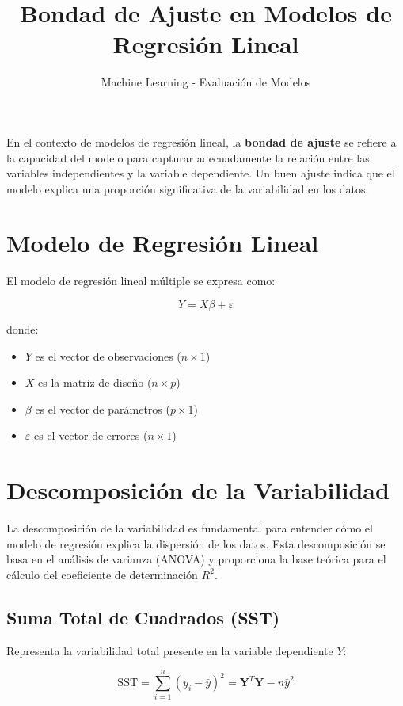 \documentclass[12pt]{article}
\title{Bondad de Ajuste en Modelos de Regresión Lineal}
\author{Machine Learning - Evaluación de Modelos}
\date{}
\begin{document}
\maketitle



En el contexto de modelos de regresión lineal, la \textbf{bondad de ajuste} se refiere a la capacidad del modelo para capturar adecuadamente la relación entre las variables independientes y la variable dependiente. Un buen ajuste indica que el modelo explica una proporción significativa de la variabilidad en los datos.



\section{Modelo de Regresión Lineal}

El modelo de regresión lineal múltiple se expresa como:

\[
Y = X\beta + \varepsilon
\]

donde:
\begin{itemize}
\item $Y$ es el vector de observaciones ($n \times 1$)
\item $X$ es la matriz de diseño ($n \times p$)
\item $\beta$ es el vector de parámetros ($p \times 1$)
\item $\varepsilon$ es el vector de errores ($n \times 1$)
\end{itemize}
\section{Descomposición de la Variabilidad}



La descomposición de la variabilidad es fundamental para entender cómo el modelo de regresión explica la dispersión de los datos. Esta descomposición se basa en el análisis de varianza (ANOVA) y proporciona la base teórica para el cálculo del coeficiente de determinación $R^2$.


\subsection{Suma Total de Cuadrados (SST)}

Representa la variabilidad total presente en la variable dependiente $Y$:

\[
\text{SST} = \sum_{i=1}^{n}(y_i - \bar{y})^2 = \mathbf{Y}^T\mathbf{Y} - n\bar{y}^2
\]
\end{document}
